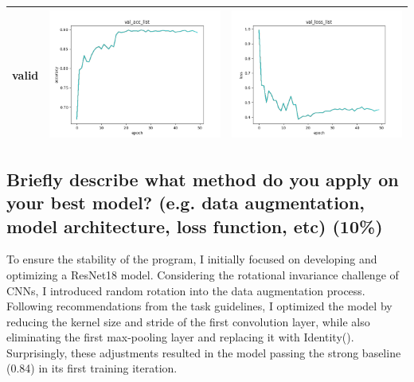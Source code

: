 \documentclass[a4paper, 12pt]{article}
\begin{document}
\begin{table}[!htb]
\begin{tabular}{|c|c|c|}
    \hline
    valid & \includegraphics[scale=0.5]{p2/experiment/resnet18_2024_04_12_14_05_14_sgd_pre_da/log/val_acc_list.png}   & \includegraphics[scale=0.5]{p2/experiment/resnet18_2024_04_12_14_05_14_sgd_pre_da/log/val_loss_list.png}   \\
    \hline
  \end{tabular}
\end{table}

\vspace{10em}

\subsection{Briefly describe what method do you apply on your best model? (e.g. data augmentation, model architecture, loss function, etc) (10\%)}
To ensure the stability of the program, I initially focused on developing and optimizing a ResNet18 model.  Considering the rotational invariance challenge of CNNs,  I introduced random rotation into the data augmentation process. Following recommendations from the task guidelines, I optimized the model by reducing the kernel size and stride of the first convolution layer, while also eliminating the first max-pooling layer and replacing it with Identity(). Surprisingly, these adjustments resulted in the model passing the strong baseline (0.84) in its first training iteration.
\end{document}
